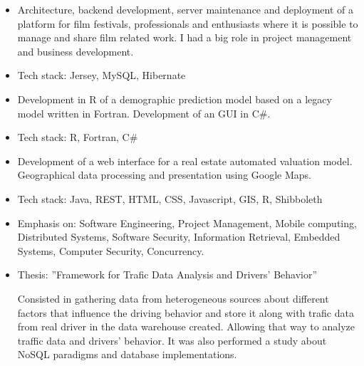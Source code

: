 \documentclass[10pt,a4paper]{altacv}
\begin{document}
\divider

\begin{itemize}
\justifying
\item Architecture, backend development, server maintenance and deployment of a
  platform for film festivals, professionals and enthusiasts where it is
  possible to manage and share film related work. I had a big role in project
  management and business development.
\item Tech stack: Jersey, MySQL, Hibernate
\end{itemize}

\divider

\begin{itemize}
\justifying
\item Development in R of a demographic prediction model based on a legacy model 
written in Fortran. Development of an GUI in C#.
\item Tech stack: R, Fortran, C#
\end{itemize}

\newpage 

\begin{itemize}
\justifying
\item Development of a web interface for a real estate automated valuation model.
Geographical data processing and presentation using Google Maps.
\item Tech stack: Java, REST, HTML, CSS, Javascript, GIS, R, Shibboleth
\end{itemize}

 
\begin{itemize}
\justifying
\item Emphasis on: Software Engineering, Project Management, Mobile computing, Distributed Systems, Software Security, Information Retrieval, Embedded Systems, Computer Security, Concurrency.
\item Thesis: ''Framework for Trafic Data Analysis and Drivers’ Behavior''
  
Consisted in gathering data from heterogeneous sources about different factors
that influence the driving behavior and store it along with trafic data from real
driver in the data warehouse created. Allowing that way to analyze traffic data
and drivers’ behavior. It was also performed a study about NoSQL paradigms and
database implementations.
\end{itemize}
\divider
\end{document}
